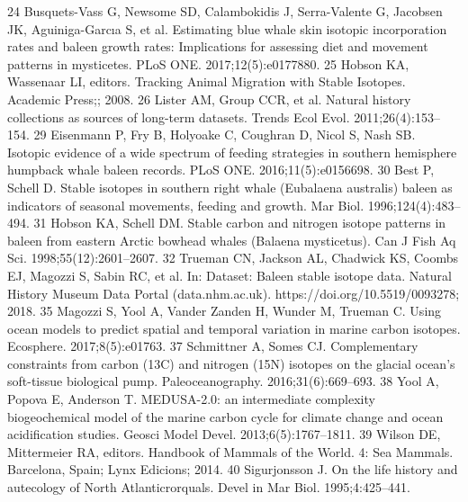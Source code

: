 \documentclass[a4paper,12pt]{article}
\begin{document}
24 Busquets-Vass G, Newsome SD, Calambokidis J, Serra-Valente G,
Jacobsen JK, Aguiniga-Garcıa S, et al. Estimating blue whale skin
isotopic incorporation rates and baleen growth rates: Implications for assessing diet and movement patterns in mysticetes. PLoS ONE.
2017;12(5):e0177880.
25 Hobson KA, Wassenaar LI, editors. Tracking Animal Migration with
Stable Isotopes. Academic Press;; 2008.
26 Lister AM, Group CCR, et al. Natural history collections as sources of long-term datasets. Trends Ecol Evol. 2011;26(4):153–154.
29 Eisenmann P, Fry B, Holyoake C, Coughran D, Nicol S, Nash SB.
Isotopic evidence of a wide spectrum of feeding strategies in southern
hemisphere humpback whale baleen records. PLoS ONE. 2016;11(5):e0156698.
30 Best P, Schell D. Stable isotopes in southern right whale (Eubalaena australis) baleen as indicators of seasonal movements, feeding and growth. Mar Biol. 1996;124(4):483–494.
31 Hobson KA, Schell DM. Stable carbon and nitrogen isotope patterns in baleen from eastern Arctic bowhead whales (Balaena mysticetus). Can J Fish Aq Sci. 1998;55(12):2601–2607.
32 Trueman CN, Jackson AL, Chadwick KS, Coombs EJ, Magozzi S, Sabin
RC, et al. In: Dataset: Baleen stable isotope data. Natural History
Museum Data Portal (data.nhm.ac.uk). https://doi.org/10.5519/0093278; 2018.
35 Magozzi S, Yool A, Vander Zanden H, Wunder M, Trueman C. Using
ocean models to predict spatial and temporal variation in marine
carbon isotopes. Ecosphere. 2017;8(5):e01763.
37 Schmittner A, Somes CJ. Complementary constraints from carbon
(13C) and nitrogen (15N) isotopes on the glacial ocean’s soft-tissue
biological pump. Paleoceanography. 2016;31(6):669–693.
38 Yool A, Popova E, Anderson T. MEDUSA-2.0: an intermediate
complexity biogeochemical model of the marine carbon cycle for
climate change and ocean acidification studies. Geosci Model Devel.
2013;6(5):1767–1811.
39 Wilson DE, Mittermeier RA, editors. Handbook of Mammals of the
World. 4: Sea Mammals. Barcelona, Spain; Lynx Edicions; 2014.
40 Sigurjonsson J. On the life history and autecology of North Atlanticrorquals. Devel in Mar Biol. 1995;4:425–441.
\end{document}
